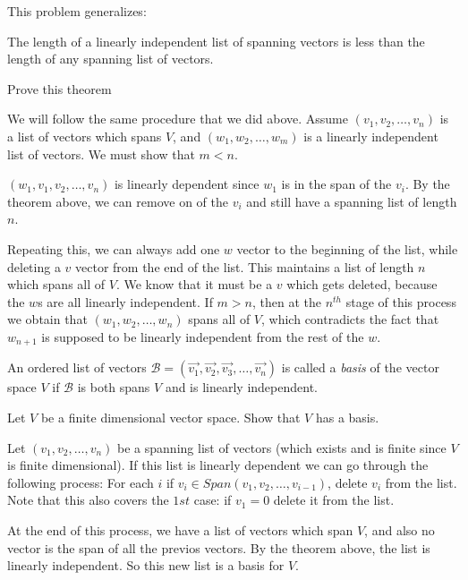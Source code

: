 \documentclass{ximera}
\begin{document}
This problem generalizes:

 \begin{theorem}
 	The length of a linearly independent list of spanning vectors is less than the length of any spanning list of vectors.
	\end{theorem}
Prove this theorem
 \begin{free-response}
 	We will follow the same procedure that we did above.  Assume
        $(v_1,v_2,\ldots,v_n)$ is a list of vectors which spans $V$,
        and $(w_1,w_2,\ldots,w_m)$ is a linearly independent list of
        vectors.  We must show that $m<n$.
 	
 	$(w_1,v_1,v_2,\ldots,v_n)$ is linearly dependent since $w_1$
        is in the span of the $v_i$.  By the theorem above, we can
        remove on of the $v_i$ and still have a spanning list of
        length $n$.
 	
 	Repeating this, we can always add one $w$ vector to the
        beginning of the list, while deleting a $v$ vector from the
        end of the list.  This maintains a list of length $n$ which
        spans all of $V$.  We know that it must be a $v$ which gets
        deleted, because the $w$s are all linearly independent.  If
        $m>n$, then at the $n^{th}$ stage of this process we obtain
        that $(w_1,w_2,\ldots,w_n)$ spans all of $V$, which
        contradicts the fact that $w_{n+1}$ is supposed to be linearly
        independent from the rest of the $w$.
 \end{free-response}
 
 \begin{definition}
 	An ordered list of vectors $\mathcal{B} = (\vec{v_1},\vec{v_2},\vec{v_3},\ldots,\vec{v_n})$ is called a \textit{basis} of the vector space $V$ if 
 	$\mathcal{B}$ is both spans $V$ and is linearly independent.  
 \end{definition}
 
 
 
 	Let $V$ be a finite dimensional vector space.  Show that $V$ has a basis.
\begin{free-response}
	Let $(v_1,v_2,\ldots,v_n)$ be a spanning list of vectors (which exists and is finite since $V$ is finite dimensional).  If this list is linearly dependent we can 
	go through the following process:
	For each $i$ if $v_i \in Span(v_1,v_2,\ldots,v_{i-1})$, delete $v_i$ from the list.  Note that this also covers the $1st$ case:  if $v_1=0$ delete it from the list.
	
	At the end of this process, we have a list of vectors which span $V$, and also no vector is the span of all the previos vectors.  By the theorem above, the list is linearly 
	independent.  So this new list is a basis for $V$.
\end{free-response}
\end{document}
